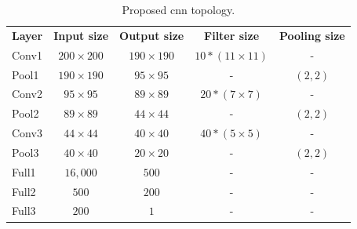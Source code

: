 \begin{table}[!h]
	\centering
	\begin{tabular}{|l||c|c|c|c|}
		\hline
		\textbf{Layer} & \textbf{Input size} & \textbf{Output size} & \textbf{Filter size} & \textbf{Pooling size} \\ \hhline{=#====}
		
		Conv1 & $200\times 200$ & $190\times190$ & $10*(11\times11)$ & -\\ \hline
		
		Pool1 & $190\times190$ & $95\times95$ & - & $(2,2)$\\ \hline
		
		Conv2 & $95\times95$ & $89\times89$ & $20*(7\times7)$ & - \\ \hline
		
		Pool2 & $89\times89$ & $44\times44$ & - & $(2,2)$\\ \hline
		
		Conv3 & $44\times44$ & $40\times40$ & $40*(5\times5)$ & - \\ \hline
		
		Pool3 & $40\times40$ & $20\times20$ & - & $(2,2)$\\ \hline
		
		Full1 & $16,000$ & $500$ & - & - \\ \hline
		
		Full2 & $500$ & $200$ & - & - \\ \hline
		
		Full3 & $200$ & $1$ & - & - \\ \hline
	\end{tabular}
	\caption{Proposed \acrshort{cnn} topology.}
	\label{tab:cnnTopo}
\end{table}







